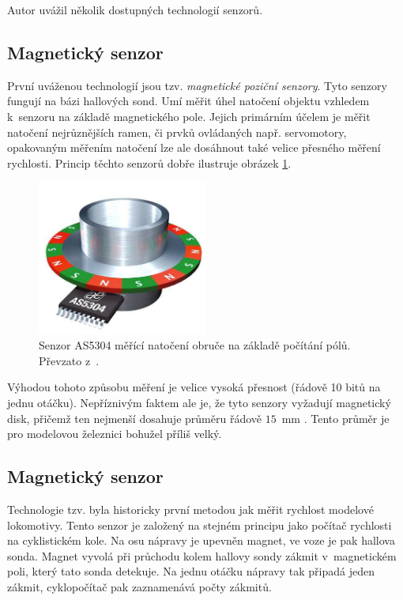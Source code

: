 Autor uvážil několik dostupných technologií senzorů.

\subsection{Magnetický senzor}
\label{subsec:wsm-senzor-mag}

První uváženou technologií jsou tzv. \textit{magnetické poziční senzory}.
Tyto senzory fungují na bázi hallových sond. Umí měřit úhel natočení objektu
vzhledem k~senzoru na základě magnetického pole. Jejich primárním účelem je
měřit natočení nejrůznějších ramen, či prvků ovládaných např. servomotory,
opakovaným měřením natočení lze ale dosáhnout také velice přesného měření
rychlosti. Princip těchto senzorů dobře ilustruje obrázek
\ref{fig:magnetic-sensor}.

\begin{figure}[ht]
\includegraphics[width=0.5\textwidth]{data/magnetic_sensor.png}
\caption{Senzor AS5304 měřící natočení obruče na základě počítání pólů. Převzato
z~\cite{as5306}.}
\label{fig:magnetic-sensor}
\end{figure}

Výhodou tohoto způsobu měření je velice vysoká přesnost (řádově 10 bitů na
jednu otáčku). Nepříznivým faktem ale je, že tyto senzory vyžadují magnetický
disk, přičemž ten nejmenší dosahuje průměru řádově $15$~mm \cite{magnets}.
Tento průměr je pro modelovou železnici bohužel příliš velký.

\subsection{Magnetický senzor }
\label{subsec:wsm-senzor-cyclo}

Technologie tzv.  byla historicky první metodou jak měřit
rychlost modelové lokomotivy. Tento senzor je založený na stejném principu jako
počítač rychlosti na cyklistickém kole. Na osu nápravy je upevněn magnet, ve
voze je pak hallova sonda. Magnet vyvolá při průchodu kolem hallovy sondy
zákmit v~magnetickém poli, který tato sonda detekuje. Na jednu otáčku nápravy
tak připadá jeden zákmit, cyklopočítač pak zaznamenává počty zákmitů.

